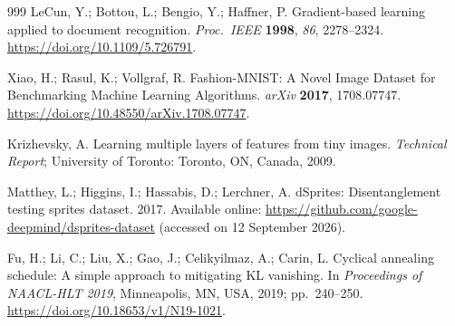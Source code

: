 \documentclass[11pt,a4paper]{ltjsarticle}
\begin{document}
\begin{thebibliography}{999}
LeCun, Y.; Bottou, L.; Bengio, Y.; Haffner, P.
Gradient-based learning applied to document recognition.
\textit{Proc.\ IEEE} \textbf{1998}, \textit{86}, 2278--2324.
\url{https://doi.org/10.1109/5.726791}.

Xiao, H.; Rasul, K.; Vollgraf, R.
Fashion-{MNIST}: A Novel Image Dataset for Benchmarking Machine Learning
Algorithms.
\textit{arXiv} \textbf{2017}, 1708.07747. \url{https://doi.org/10.48550/arXiv.1708.07747}.

Krizhevsky, A.
Learning multiple layers of features from tiny images.
\textit{Technical Report}; University of Toronto: Toronto, ON, Canada,
2009.

Matthey, L.; Higgins, I.; Hassabis, D.; Lerchner, A.
dSprites: Disentanglement testing sprites dataset. 2017.
Available online: \url{https://github.com/google-deepmind/dsprites-dataset}
(accessed on 12 September 2026).

Fu, H.; Li, C.; Liu, X.; Gao, J.; Celikyilmaz, A.; Carin, L.
Cyclical annealing schedule: A simple approach to mitigating KL vanishing.
In \textit{Proceedings of NAACL-HLT 2019}, Minneapolis, MN, USA, 2019;
pp.~240--250. \url{https://doi.org/10.18653/v1/N19-1021}.

\end{thebibliography}
\end{document}
